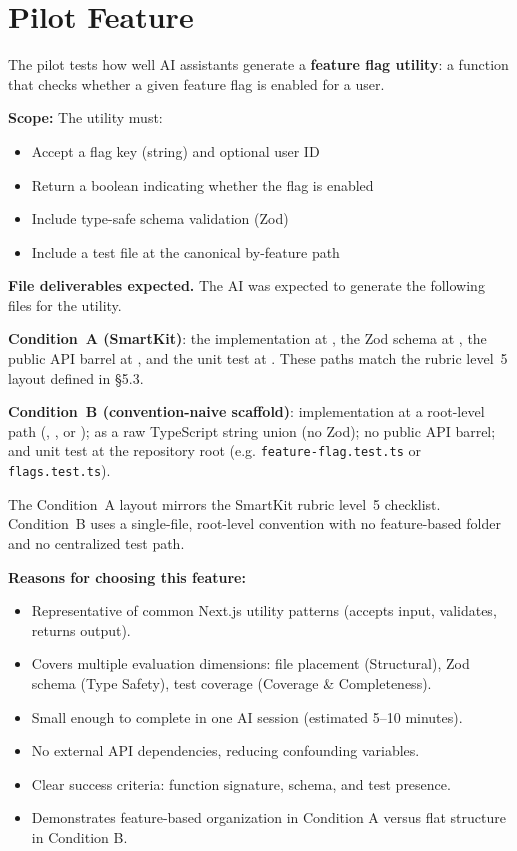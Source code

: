 \section{Pilot Feature}

The pilot tests how well AI assistants generate a \textbf{feature flag utility}: a function that checks whether a given feature flag is enabled for a user.

\textbf{Scope:} The utility must:
\begin{itemize}
\item Accept a flag key (string) and optional user ID
\item Return a boolean indicating whether the flag is enabled
\item Include type-safe schema validation (Zod)
\item Include a test file at the canonical by-feature path
\end{itemize}

\textbf{File deliverables expected.} The AI was expected to generate the following files for the  utility.

\textbf{Condition~A (SmartKit)}: the implementation at , the Zod  schema at , the public API barrel at , and the unit test at . These paths match the rubric level~5 layout defined in \S5.3.

\textbf{Condition~B (convention-naive scaffold)}: implementation at a root-level path (, , or );  as a raw TypeScript string union (no Zod); no public API barrel; and unit test at the repository root (e.g. \texttt{feature-flag.test.ts} or \texttt{flags.test.ts}).

The Condition~A layout mirrors the SmartKit rubric level~5 checklist. Condition~B uses a single-file, root-level convention with no feature-based folder and no centralized test path.

\textbf{Reasons for choosing this feature:}
\begin{itemize}
\item Representative of common Next.js utility patterns (accepts input, validates, returns output).
\item Covers multiple evaluation dimensions: file placement (Structural), Zod schema (Type Safety), test coverage (Coverage \& Completeness).
\item Small enough to complete in one AI session (estimated 5--10 minutes).
\item No external API dependencies, reducing confounding variables.
\item Clear success criteria: function signature, schema, and test presence.
\item Demonstrates feature-based organization in Condition A versus flat structure in Condition B.
\end{itemize}

